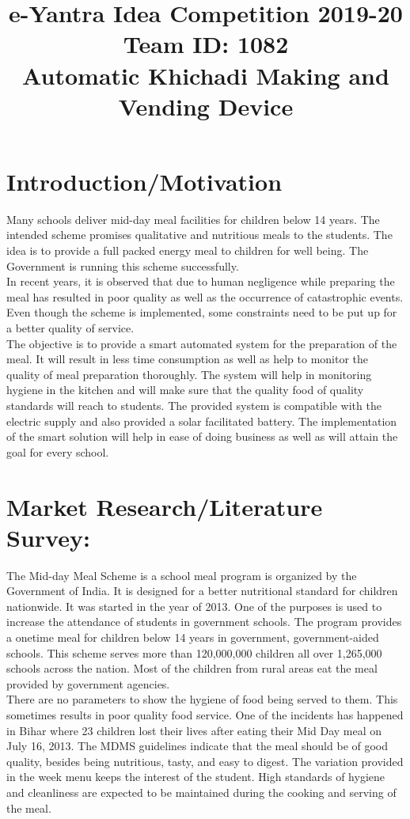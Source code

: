 \documentclass{article}
\begin{document}
\title{e-Yantra Idea Competition 2019-20\\Team ID: 1082\\Automatic Khichadi Making and Vending Device} 
\maketitle

\section{Introduction/Motivation}
Many schools deliver mid-day meal facilities for children below 14 years. The intended scheme promises
qualitative and nutritious meals to the students. The idea is to provide a full packed energy meal to children
for well being. The Government is running this scheme successfully.\\
In recent years, it is observed that due
to human negligence while preparing the meal has resulted in poor quality as well as the occurrence of
catastrophic events. Even though the scheme is implemented, some constraints need to be put up for a better
quality of service.\\
The objective is to provide a smart automated system for the preparation of the meal. It
will result in less time consumption as well as help to monitor the quality of meal preparation thoroughly.
The system will help in monitoring hygiene in the kitchen and will make sure that the quality food of quality
standards will reach to students. The provided system is compatible with the electric supply and also
provided a solar facilitated battery. The implementation of the smart solution will help in ease of doing
business as well as will attain the goal for every school.

\section{Market Research/Literature Survey:}
The Mid-day Meal Scheme is a school meal program is organized by the Government of India. It is designed
for a better nutritional standard for children nationwide. It was started in the year of 2013. One of the
purposes is used to increase the attendance of students in government schools. The program provides a onetime meal for children below 14 years in government, government-aided schools. This scheme serves more
than 120,000,000 children all over 1,265,000 schools across the nation. Most of the children from rural areas
eat the meal provided by government agencies.\\
There are no parameters to show the hygiene of food being served to them. This sometimes results in poor
quality food service. One of the incidents has happened in Bihar where 23 children lost their lives after
eating their Mid Day meal on July 16, 2013. The MDMS guidelines indicate that the meal should be of good
quality, besides being nutritious, tasty, and easy to digest. The variation provided in the week menu keeps
the interest of the student. High standards of hygiene and cleanliness are expected to be maintained during
the cooking and serving of the meal.
\end{document}
